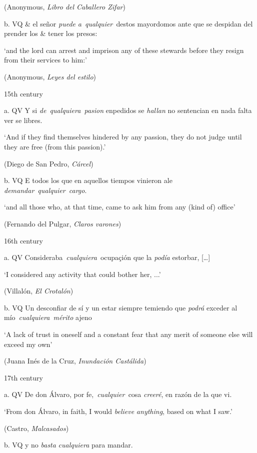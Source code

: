 \documentclass[output=paper]{langscibook}
\begin{document}
      (Anonymous, \textit{Libro del Caballero Zifar})

  b.  VQ  \& el señor \textit{puede} \textit{a~qualquier~}destos mayordomos ante que se despidan del prender los \& tener los presos: 

      ‘and the lord can arrest and imprison any of these stewards before they resign from their services to him:’

      (Anonymous, \textit{Leyes del estilo})

  15th century

  a.  QV  Y si \textit{de~qualquiera~pasion} enpedidos se \textit{hallan} no sentencian en nada falta ver se libres. 

      ‘And if they find themselves hindered by any passion, they do not judge until they are free (from this passion).’

      (Diego de San Pedro, \textit{Cárcel})

  b.  VQ  E todos los que en aquellos tiempos vinieron ale \textit{demandar}~\textit{qualquier~cargo}. 

      ‘and all those who, at that time, came to ask him from any (kind of) office’

      (Fernando del Pulgar, \textit{Claros varones})

  16th century

  a.  QV  Consideraba~\textit{cualquiera}~ocupaçión que la \textit{podía} estorbar, […]

      ‘I considered any activity that could bother her, ...’

      (Villalón, \textit{El Crotalón})

  b.  VQ  Un desconfiar de sí y un estar siempre temiendo que \textit{podrá} exceder al mío~\textit{cualquiera~mérito} ajeno 

      ‘A lack of trust in oneself and a constant fear that any merit of someone else will exceed my own’

      (Juana Inés de la Cruz, \textit{Inundación Castálida})

  17th century

  a.  QV  De don Álvaro, por fe,~\textit{cualquier~}cosa \textit{creeré}, en razón de la que vi. 

      ‘From don Álvaro, in faith, I would \textit{believe} \textit{anything}, based on what I saw.’

      (Castro, \textit{Malcasados})

  b.  VQ  y no \textit{basta} \textit{cualquiera} para mandar. 
\end{document}
